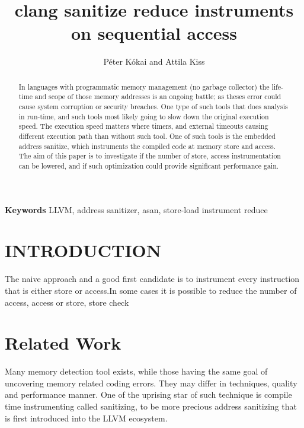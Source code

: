 \documentclass[letterpaper, 10 pt, conference]{IEEEtran}  %
\title{\LARGE \bf
clang sanitize reduce instruments on sequential access
}
\author{P\'eter K\'okai and Attila Kiss}
\let\cite\parencite
\begin{document}
\maketitle
\thispagestyle{empty}
\pagestyle{empty}


\begin{abstract}
In languages with programmatic memory management (no garbage collector) the life-time and scope of those memory addresses is an ongoing battle; as theses error could cause system corruption or security breaches. One type of such tools that does analysis in run-time, and such tools most likely going to slow down the original execution speed. The execution speed matters where timers, and external timeouts causing different execution path than without such tool. One of such tools is the embedded address sanitize, which instruments the compiled code at memory store and access. The aim of this paper is to investigate if the number of store, access instrumentation can be lowered, and if such optimization could provide significant performance gain.
\end{abstract} \hspace{10pt}

\small \textbf{Keywords} LLVM, address sanitizer, asan, store-load instrument reduce

\section{INTRODUCTION}
The naive approach and a good first candidate is to instrument every instruction that is either store or access.In some cases it is possible to reduce the number of access, access or store, store check

\section{Related Work}
Many memory detection tool exists, while those having the same goal of uncovering memory related coding errors. They may differ in techniques, quality and performance manner. One of the uprising star of such technique is compile time instrumenting called sanitizing, to be more precious address sanitizing \cite{serebryany2012addresssanitizer} that is first introduced into the LLVM\cite{lattner2004llvm}\cite{lattner2006introduction}\cite{lattner2007llvm} ecosystem.
\end{document}
